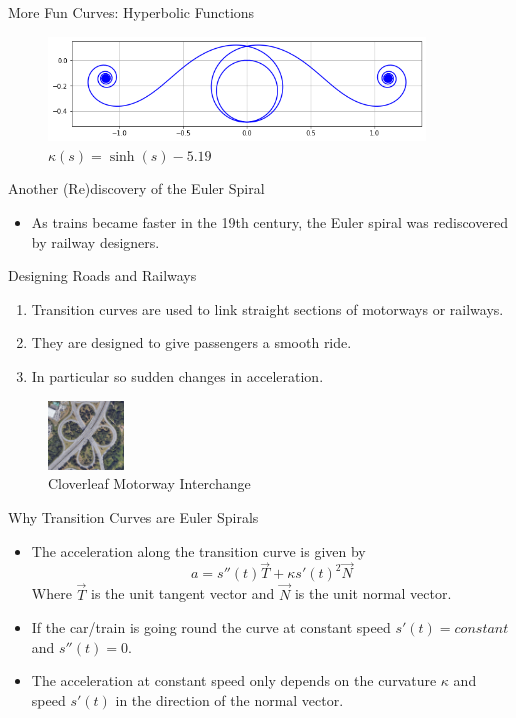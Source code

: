 \documentclass{beamer}
\begin{document}
\begin{frame}{More Fun Curves: Hyperbolic Functions}
	\begin{figure}
		\caption{$\kappa(s) = \sinh(s) - 5.19$}
		\centering
		\includegraphics[width=100mm, scale=0.5]{sinh.png}
	\end{figure}
\end{frame}

\begin{frame}{Another (Re)discovery of the Euler Spiral}
	\begin{itemize}
		\item As trains became faster in the 19th century, the Euler spiral was rediscovered by railway designers.
	\end{itemize}
\end{frame}

\begin{frame}{Designing Roads and Railways}
	\begin{enumerate}
		\item Transition curves are used to link straight sections of motorways or railways.
		\item They are designed to give passengers a smooth ride.
		\item In particular so sudden changes in acceleration.

	\end{enumerate}
		\begin{figure}
		\caption{Cloverleaf Motorway Interchange}
		\centering
		\includegraphics[width=20mm, scale=0.5]{cloverleaf_motorway.png}
	\end{figure}

\end{frame}

\begin{frame}{Why Transition Curves are Euler Spirals}
	\begin{itemize}
	\item The acceleration along the transition curve is given by
 	 \[
 	 a=s''(t) \vec{T}+\kappa s'(t)^2 \vec{N}
 	 \]
 	 Where $\vec{T}$ is the unit tangent vector and $\vec{N}$ is the unit normal vector.
 	 \item If the car/train is going round the curve at constant speed $s'(t)=constant$ and $s''(t)=0$.	
 	 \item The acceleration at constant speed only depends on the curvature $\kappa$ and speed $s'(t)$ in the direction of the normal vector.
	\end{itemize}
\end{frame}
\end{document}
